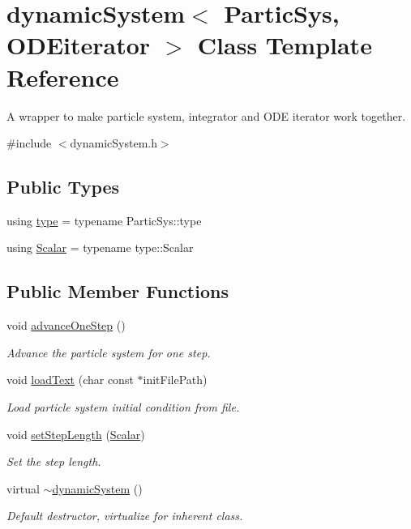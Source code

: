 \hypertarget{classdynamic_system}{}\section{dynamic\+System$<$ Partic\+Sys, O\+D\+Eiterator $>$ Class Template Reference}
\label{classdynamic_system}


A wrapper to make particle system, integrator and O\+DE iterator work together.  




{\ttfamily \#include $<$dynamic\+System.\+h$>$}

\subsection*{Public Types}
\begin{DoxyCompactItemize}
\item 
using \mbox{\hyperlink{classdynamic_system_a518990ebef8f3f6257e6ef0e49fe013e}{type}} = typename Partic\+Sys\+::type
\item 
using \mbox{\hyperlink{classdynamic_system_a6eb7b06a4ee5721a1ee0855a854c3431}{Scalar}} = typename type\+::\+Scalar
\end{DoxyCompactItemize}
\subsection*{Public Member Functions}
\begin{DoxyCompactItemize}
\item 
void \mbox{\hyperlink{classdynamic_system_a7a4032c043dd0286007f4d7c542d3f95}{advance\+One\+Step}} ()
\begin{DoxyCompactList}\small\item\em Advance the particle system for one step. \end{DoxyCompactList}\item 
void \mbox{\hyperlink{classdynamic_system_a3ff4342241733e94edce17c1a79a90a8}{load\+Text}} (char const $\ast$init\+File\+Path)
\begin{DoxyCompactList}\small\item\em Load particle system initial condition from file. \end{DoxyCompactList}\item 
void \mbox{\hyperlink{classdynamic_system_a0392d5b36a03692d65616f3b40168948}{set\+Step\+Length}} (\mbox{\hyperlink{classdynamic_system_a6eb7b06a4ee5721a1ee0855a854c3431}{Scalar}})
\begin{DoxyCompactList}\small\item\em Set the step length. \end{DoxyCompactList}\item 
virtual \mbox{\hyperlink{classdynamic_system_a239af38fcf35f3fe32d5ae5e183e4cca}{$\sim$dynamic\+System}} ()
\begin{DoxyCompactList}\small\item\em Default destructor, virtualize for inherent class. \end{DoxyCompactList}\end{DoxyCompactItemize}
